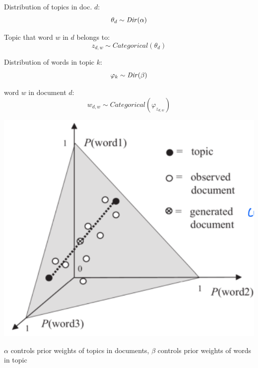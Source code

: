 \begin{minipage}{0.5\columnwidth}
Distribution of topics in doc. $d$: 
$$
	\theta_d\sim\mathit{Dir}(\alpha)
$$

Topic that word $w$ in $d$ belongs to:
$$
	z_{d,w} \sim \mathit{Categorical}(\theta_d)
$$

Distribution of words in topic $k$:
$$
	\varphi_k \sim \mathit{Dir}(\beta)
$$

word $w$ in document $d$: 
$$
	w_{d,w}\sim \mathit{Categorical}(\varphi_{z_{d,w}})
$$
\end{minipage}
\begin{minipage}{0.4\columnwidth}
	\begin{center}
		\includegraphics[width=\columnwidth]{images/12b-lda}
	\end{center}
	$\alpha$ controls prior weights of topics in documents, $\beta$ controls prior weights of words in topic
\end{minipage}



